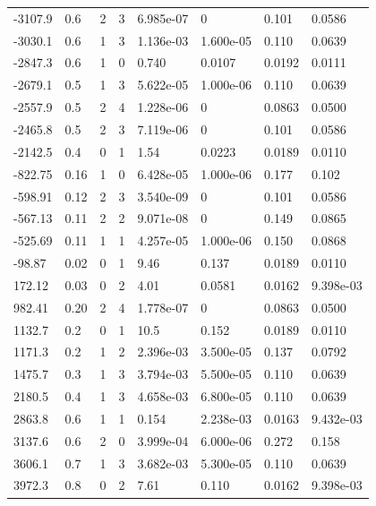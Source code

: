 \documentclass[preview]{standalone}
\begin{document}
{{\begin{tabular}{L{1.2cm}C{1.2cm} C{0.3cm}C{0.5cm} C{1.4cm}C{1.4cm} C{1.4cm}C{1.4cm}}
  -3107.9  &   0.6  & 2     &  3 &  6.985e-07  & 0  & 0.101 &  0.0586   \\ 
  -3030.1  &   0.6  & 1     &  3 &  1.136e-03  & 1.600e-05  & 0.110 &  0.0639   \\ 
  -2847.3  &   0.6  & 1     &  0 &  0.740  & 0.0107  & 0.0192 &  0.0111   \\ 
  -2679.1  &   0.5  & 1     &  3 &  5.622e-05  & 1.000e-06  & 0.110 &  0.0639   \\ 
  -2557.9  &   0.5  & 2     &  4 &  1.228e-06  & 0  & 0.0863 &  0.0500   \\ 
  -2465.8  &   0.5  & 2     &  3 &  7.119e-06  & 0  & 0.101 &  0.0586   \\ 
  -2142.5  &   0.4  & 0     &  1 &  1.54  & 0.0223  & 0.0189 &  0.0110   \\ 
  -822.75  &  0.16  & 1     &  0 &  6.428e-05  & 1.000e-06  & 0.177 &  0.102   \\ 
  -598.91  &  0.12  & 2     &  3 &  3.540e-09  & 0  & 0.101 &  0.0586   \\ 
  -567.13  &  0.11  & 2     &  2 &  9.071e-08  & 0  & 0.149 &  0.0865   \\ 
  -525.69  &  0.11  & 1     &  1 &  4.257e-05  & 1.000e-06  & 0.150 &  0.0868   \\ 
  -98.87  &  0.02  & 0     &  1 &  9.46  & 0.137  & 0.0189 &  0.0110   \\ 
  172.12  &  0.03  & 0     &  2 &  4.01  & 0.0581  & 0.0162 &  9.398e-03   \\ 
  982.41  &  0.20  & 2     &  4 &  1.778e-07  & 0  & 0.0863 &  0.0500   \\ 
  1132.7  &   0.2  & 0     &  1 &  10.5  & 0.152  & 0.0189 &  0.0110   \\ 
  1171.3  &   0.2  & 1     &  2 &  2.396e-03  & 3.500e-05  & 0.137 &  0.0792   \\ 
  1475.7  &   0.3  & 1     &  3 &  3.794e-03  & 5.500e-05  & 0.110 &  0.0639   \\ 
  2180.5  &   0.4  & 1     &  3 &  4.658e-03  & 6.800e-05  & 0.110 &  0.0639   \\ 
  2863.8  &   0.6  & 1     &  1 &  0.154  & 2.238e-03  & 0.0163 &  9.432e-03   \\ 
  3137.6  &   0.6  & 2     &  0 &  3.999e-04  & 6.000e-06  & 0.272 &  0.158   \\ 
  3606.1  &   0.7  & 1     &  3 &  3.682e-03  & 5.300e-05  & 0.110 &  0.0639   \\ 
  3972.3  &   0.8  & 0     &  2 &  7.61  & 0.110  & 0.0162 &  9.398e-03   \\ 

\end{tabular}}}
\end{document}
